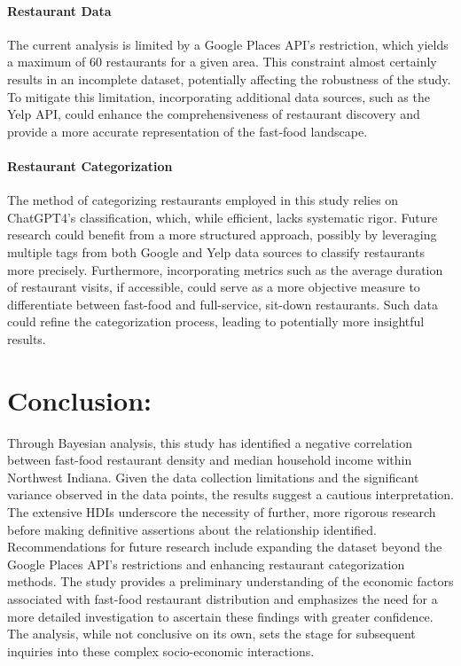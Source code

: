 \documentclass[12pt]{article}
\begin{document}
\paragraph{Restaurant Data}
The current analysis is limited by a Google Places API's restriction, which yields a maximum of 60 restaurants for a given area. This constraint almost certainly results in an incomplete dataset, potentially affecting the robustness of the study. To mitigate this limitation, incorporating additional data sources, such as the Yelp API, could enhance the comprehensiveness of restaurant discovery and provide a more accurate representation of the fast-food landscape.

\paragraph{Restaurant Categorization}
The method of categorizing restaurants employed in this study relies on ChatGPT4's classification, which, while efficient, lacks systematic rigor. Future research could benefit from a more structured approach, possibly by leveraging multiple tags from both Google and Yelp data sources to classify restaurants more precisely. Furthermore, incorporating metrics such as the average duration of restaurant visits, if accessible, could serve as a more objective measure to differentiate between fast-food and full-service, sit-down restaurants. Such data could refine the categorization process, leading to potentially more insightful results.

\section*{Conclusion:}
\noindent Through Bayesian analysis, this study has identified a negative correlation between fast-food restaurant density and median household income within Northwest Indiana. Given the data collection limitations and the significant variance observed in the data points, the results suggest a cautious interpretation. The extensive HDIs underscore the necessity of further, more rigorous research before making definitive assertions about the relationship identified. Recommendations for future research include expanding the dataset beyond the Google Places API's restrictions and enhancing restaurant categorization methods. The study provides a preliminary understanding of the economic factors associated with fast-food restaurant distribution and emphasizes the need for a more detailed investigation to ascertain these findings with greater confidence. The analysis, while not conclusive on its own, sets the stage for subsequent inquiries into these complex socio-economic interactions.
\end{document}
